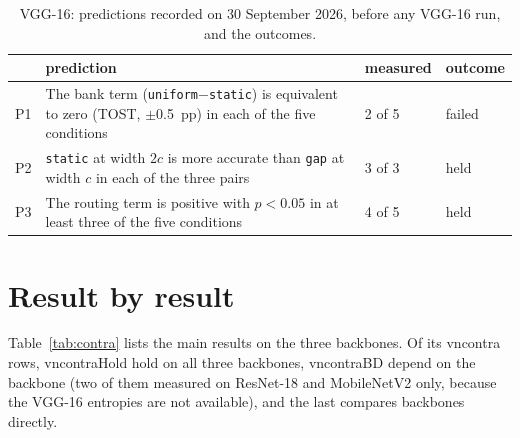 \documentclass[10pt,a4paper]{article}
\newcommand{\V}[1]{\csname v#1\endcsname}
\begin{document}
\begin{table}[!htbp]\centering\small
\caption{VGG-16: predictions recorded on 30 September 2026, before any
VGG-16 run, and the outcomes.}
\label{tab:vgprereg}
\begin{tabular}{l p{8.2cm} l l}
\toprule
& prediction & measured & outcome \\
\midrule
P1 & The bank term (\texttt{uniform}$-$\texttt{static}) is equivalent to zero (TOST, $\pm$\SI{0.5}{pp}) in each of the five conditions & 2 of 5 & failed \\
P2 & \texttt{static} at width $2c$ is more accurate than \texttt{gap} at width $c$ in each of the three pairs & 3 of 3 & held \\
P3 & The routing term is positive with $p<0.05$ in at least three of the five conditions & 4 of 5 & held \\
\bottomrule
\end{tabular}
\end{table}

\section{Result by result}\label{sec:summary}

Table~\ref{tab:contra} lists the main results on the three backbones. Of
its \V{ncontra} rows, \V{ncontraHold} hold on all three backbones,
\V{ncontraBD} depend on the backbone (two of them measured on ResNet-18 and
MobileNetV2 only, because the VGG-16 entropies are not available), and
the last compares backbones directly.
\end{document}
